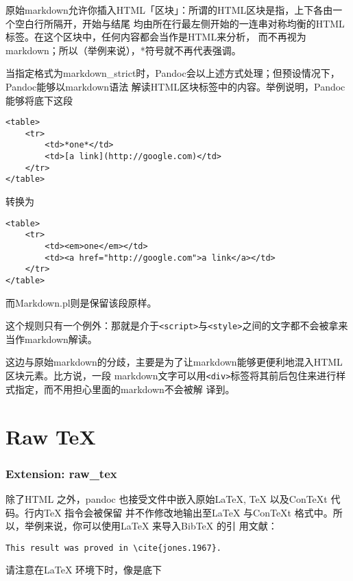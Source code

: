 \documentclass[fancyhdr,bookmark]{ctexbook}
\newcommand{\passthrough}[1]{#1}
\begin{document}
原始markdown允许你插入HTML「区块」：所谓的HTML区块是指，上下各由一个空白行所隔开，开始与结尾
均由所在行最左侧开始的一连串对称均衡的HTML标签。在这个区块中，任何内容都会当作是HTML来分析，
而不再视为markdown；所以（举例来说），*符号就不再代表强调。

当指定格式为markdown\_strict时，Pandoc会以上述方式处理；但预设情况下，Pandoc能够以markdown语法
解读HTML区块标签中的内容。举例说明，Pandoc能够将底下这段

\begin{lstlisting}
<table>
    <tr>
        <td>*one*</td>
        <td>[a link](http://google.com)</td>
    </tr>
</table>
\end{lstlisting}

转换为

\begin{lstlisting}
<table>
    <tr>
        <td><em>one</em></td>
        <td><a href="http://google.com">a link</a></td>
    </tr>
</table>
\end{lstlisting}

而Markdown.pl则是保留该段原样。

这个规则只有一个例外：那就是介于\passthrough{\lstinline!<script>!}与\passthrough{\lstinline!<style>!}之间的文字都不会被拿来当作markdown解读。

这边与原始markdown的分歧，主要是为了让markdown能够更便利地混入HTML区块元素。比方说，一段
markdown文字可以用\passthrough{\lstinline!<div>!}标签将其前后包住来进行样式指定，而不用担心里面的markdown不会被解
译到。

\hypertarget{raw-tex}{%
\section{Raw TeX}\label{raw-tex}}

\hypertarget{extension-raw_tex}{%
\subsubsection{Extension: raw\_tex}\label{extension-raw_tex}}

除了HTML 之外，pandoc 也接受文件中嵌入原始LaTeX, TeX 以及ConTeXt
代码。行内TeX 指令会被保留 并不作修改地输出至LaTeX 与ConTeXt
格式中。所以，举例来说，你可以使用LaTeX 来导入BibTeX 的引 用文献：

\begin{lstlisting}
This result was proved in \cite{jones.1967}.
\end{lstlisting}

请注意在LaTeX 环境下时，像是底下
\end{document}
